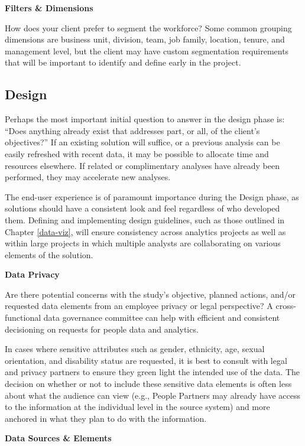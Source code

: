\documentclass[
]{book}
\begin{document}
\textbf{Filters \& Dimensions}

How does your client prefer to segment the workforce? Some common grouping dimensions are business unit, division, team, job family, location, tenure, and management level, but the client may have custom segmentation requirements that will be important to identify and define early in the project.

\hypertarget{design}{%
\subsection{Design}\label{design}}

Perhaps the most important initial question to answer in the design phase is: ``Does anything already exist that addresses part, or all, of the client's objectives?'' If an existing solution will suffice, or a previous analysis can be easily refreshed with recent data, it may be possible to allocate time and resources elsewhere. If related or complimentary analyses have already been performed, they may accelerate new analyses.

The end-user experience is of paramount importance during the Design phase, as solutions should have a consistent look and feel regardless of who developed them. Defining and implementing design guidelines, such as those outlined in Chapter \ref{data-viz}, will ensure consistency across analytics projects as well as within large projects in which multiple analysts are collaborating on various elements of the solution.

\textbf{Data Privacy}

Are there potential concerns with the study's objective, planned actions, and/or requested data elements from an employee privacy or legal perspective? A cross-functional data governance committee can help with efficient and consistent decisioning on requests for people data and analytics.

In cases where sensitive attributes such as gender, ethnicity, age, sexual orientation, and disability status are requested, it is best to consult with legal and privacy partners to ensure they green light the intended use of the data. The decision on whether or not to include these sensitive data elements is often less about what the audience can view (e.g., People Partners may already have access to the information at the individual level in the source system) and more anchored in what they plan to do with the information.

\textbf{Data Sources \& Elements}
\end{document}
